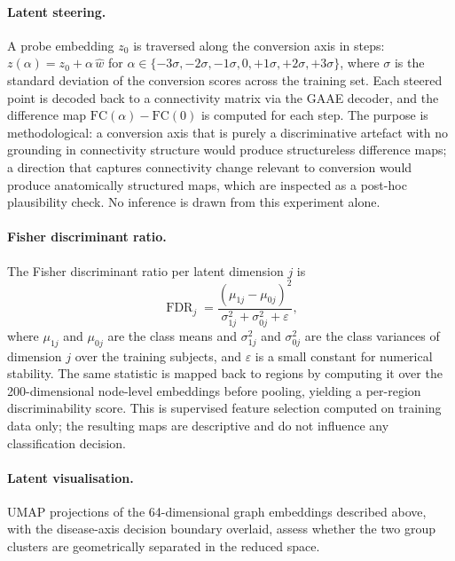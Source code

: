 \paragraph{Latent steering.}
A probe embedding $z_0$ is traversed along the conversion axis in steps:
$z(\alpha) = z_0 + \alpha\,\hat{w}$ for $\alpha \in \{-3\sigma, -2\sigma, -1\sigma, 0,
+1\sigma, +2\sigma, +3\sigma\}$, where $\sigma$ is the standard deviation of the
conversion scores across the training set. Each steered point is decoded back to a
connectivity matrix via the \ac{GAAE} decoder, and the difference map
$\text{FC}(\alpha) - \text{FC}(0)$ is computed for each step. The purpose is
methodological: a conversion axis that is purely a discriminative artefact with no grounding
in connectivity structure would produce structureless difference maps; a direction that
captures connectivity change relevant to conversion would produce anatomically structured
maps, which are inspected as a post-hoc plausibility check. No inference is drawn from
this experiment alone.

\paragraph{Fisher discriminant ratio.}
The Fisher discriminant ratio per latent dimension $j$ is
\begin{equation}
  \operatorname{FDR}_j
  = \frac{(\mu_{1j} - \mu_{0j})^2}
         {\sigma_{1j}^2 + \sigma_{0j}^2 + \varepsilon},
  \label{eq:fdr}
\end{equation}
where $\mu_{1j}$ and $\mu_{0j}$ are the class means and $\sigma_{1j}^2$ and $\sigma_{0j}^2$
are the class variances of dimension $j$ over the training subjects, and $\varepsilon$ is a
small constant for numerical stability. The same statistic is mapped back to regions by
computing it over the 200-dimensional node-level embeddings before pooling, yielding a
per-region discriminability score. This is supervised feature selection computed on
training data only; the resulting maps are descriptive and do not influence any
classification decision.

\paragraph{Latent visualisation.}
\Ac{UMAP} projections of the 64-dimensional graph embeddings described above, with the
disease-axis decision boundary overlaid, assess whether the two group clusters are
geometrically separated in the reduced space.

